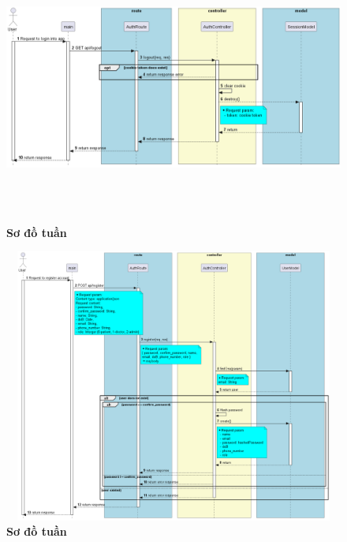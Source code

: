 \documentclass{article}%
\begin{document}
\begin{figure}[H]
  \centering
  \includegraphics[width=16cm,height=9cm]{Images/server/sequence/server/logout.png}
  \caption[Sơ đồ tuần tự ]{\bfseries \fontsize{12pt}{0pt}
  \selectfont Sơ đồ tuần }
  \label{hinh21} %
\end{figure}


\begin{figure}[H]
  \centering
  \includegraphics[width=16cm,height=9cm]{Images/server/sequence/server/register.png}
  \caption[Sơ đồ tuần tự ]{\bfseries \fontsize{12pt}{0pt}
  \selectfont Sơ đồ tuần }
  \label{hinh21} %
\end{figure}
\end{document}
